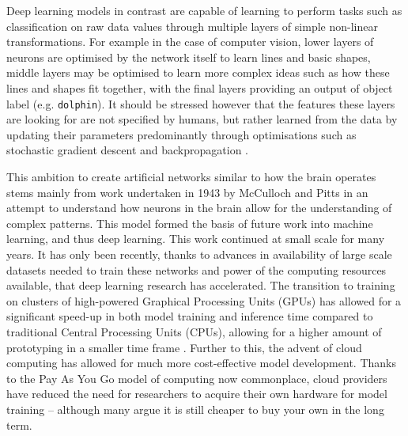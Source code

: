 Deep learning models in contrast are capable of learning to perform tasks such as classification on raw data values through multiple layers of simple non-linear transformations. For example in the case of computer vision, lower layers of neurons are optimised by the network itself to learn lines and basic shapes, middle layers may be optimised to learn more complex ideas such as how these lines and shapes fit together, with the final layers providing an output of object label (e.g. \texttt{dolphin}). It should be stressed however that the features these layers are looking for are not specified by humans, but rather learned from the data by updating their parameters predominantly through optimisations such as stochastic gradient descent and backpropagation \cite{hecht-nielsen_iii.3_1992}.

This ambition to create artificial networks similar to how the brain operates stems mainly from work undertaken in 1943 by McCulloch and Pitts \cite{mcculloch_logical_1943} in an attempt to understand how neurons in the brain allow for the understanding of complex patterns. This model formed the basis of future work into machine learning, and thus deep learning. This work continued at small scale for many years. It has only been recently, thanks to advances in availability of large scale datasets needed to train these networks and power of the computing resources available, that deep learning research has accelerated. The transition to training on clusters of high-powered Graphical Processing Units (GPUs) has allowed for a significant speed-up in both model training and inference time compared to traditional Central Processing Units (CPUs), allowing for a higher amount of prototyping in a smaller time frame \cite{luo_artificial_2005}. Further to this, the advent of cloud computing has allowed for much more cost-effective model development. Thanks to the Pay As You Go model of computing now commonplace, cloud providers have reduced the need for researchers to acquire their own hardware for model training -- although many argue it is still cheaper to buy your own in the long term. 

